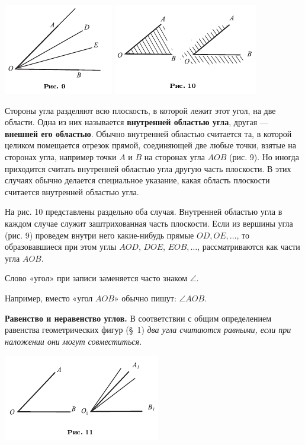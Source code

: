 \documentclass[oneside]{book}
\begin{document}
\includegraphics{pics/ris-9}
\includegraphics{pics/ris-10}

Стороны угла разделяют всю плоскость, в которой лежит этот угол, на две области.
Одна из них называется \textbf{внутренней областью угла}, другая — \textbf{внешней его областью}.
Обычно внутренней областью считается та, в которой целиком помещается отрезок прямой, соединяющей две любые точки, взятые на сторонах угла, например точки $A$ и $B$ на сторонах угла $AOB$ (рис. 9).
Но иногда приходится считать внутренней областью угла другую часть плоскости.
В этих случаях обычно делается специальное указание, какая область плоскости считается внутренней областью угла.

На рис. 10 представлены раздельно оба случая.
Внутренней областью угла в каждом случае служит заштрихованная часть плоскости.
Если из вершины угла (рис. 9) проведем внутри него какие-нибудь прямые $OD, OE,\dots$, то образовавшиеся при этом углы $AOD$, $DOE$, $EOB,\dots$, рассматриваются как части угла $AOB$.

Слово «угол» при записи заменяется часто знаком $\angle$.

Например, вместо «угол $AOB$» обычно пишут:
$\angle AOB$.

\textbf{Равенство и неравенство углов.}
В соответствии с общим определением равенства геометрических фигур (§~1) \emph{два угла считаются равными, если при наложении они могут совместиться.}

\includegraphics{pics/ris-11}
\end{document}
